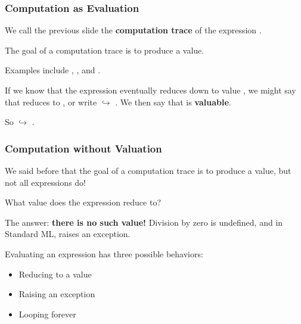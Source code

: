 \documentclass[aspectratio=169]{beamer}
\begin{document}
\begin{frame}[plain]
  \frametitle{Computation as Evaluation}

  We call the previous slide the \textbf{computation trace} of the expression . \\ 

  \vspace{5pt}

  The goal of a computation trace is to produce a value.

  \pause

  \vspace{10pt}


  \pause
  \vspace{\fill}


  \vspace{5pt}

  Examples include , , and .

  \pause
  \vspace{\fill}

  If we know that the expression  eventually reduces down to value , we might
  say that  reduces to , or write  $\hookrightarrow$ . We then say
  that  is \textbf{valuable}.

  \vspace{5pt}

  So  $\hookrightarrow$ .

\end{frame}

\begin{frame}[plain]
  \frametitle{Computation without Valuation}

  We said before that the goal of a computation trace is to produce a value, but not 
  all expressions do!

  \pause
  \vspace{\fill}

  What value does the expression  reduce to?

  \pause
  \vspace{\fill}

  The answer: \textbf{there is no such value!} Division by zero is undefined, and in
  Standard ML, raises an exception.

  \pause
  \vspace{\fill}

  Evaluating an expression has three possible behaviors:
  \begin{itemize}
    \item Reducing to a value
    \item Raising an exception
    \item Looping forever
  \end{itemize}

\end{frame}
\end{document}

